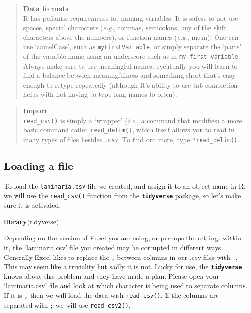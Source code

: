 \documentclass[]{book}
\newenvironment{Shaded}{\begin{snugshade}}{\end{snugshade}}
\newcommand{\KeywordTok}[1]{\textcolor[rgb]{0.13,0.29,0.53}{\textbf{#1}}}
\newcommand{\NormalTok}[1]{#1}
\theoremstyle{definition}
\theoremstyle{definition}
\theoremstyle{definition}
\theoremstyle{remark}
\begin{document}
\begin{quote}
\textbf{Data formats}\\
R has pedantic requirements for naming variables. It is safest to not
use spaces, special characters (\emph{e.g.}, commas, semicolons, any of
the shift characters above the numbers), or function names (\emph{e.g.},
mean). One can use `camelCase', such as \texttt{myFirstVariable}, or
simply separate the `parts' of the variable name using an underscore
such as in \texttt{my\_first\_variable}. Always make sure to use
meaningful names; eventually you will learn to find a balance between
meaningfulness and something short that's easy enough to retype
repeatedly (although R's ability to use tab completion helps with not
having to type long names to often).
\end{quote}

\begin{quote}
\textbf{Import}\\
\texttt{read\_csv()} is simply a `wrapper' (\emph{i.e.}, a command that
modifies) a more basic command called \texttt{read\_delim()}, which
itself allows you to read in many types of files besides \texttt{.csv}.
To find out more, type \texttt{?read\_delim()}.
\end{quote}

\subsection{Loading a file}\label{loading-a-file}

To load the \texttt{laminaria.csv} file we created, and assign it to an
object name in R, we will use the \texttt{read\_csv()} function from the
\textbf{\texttt{tidyverse}} package, so let's make sure it is activated.

\begin{Shaded}
\begin{Highlighting}[]
\KeywordTok{library}\NormalTok{(tidyverse)}
\end{Highlighting}
\end{Shaded}

Depending on the version of Excel you are using, or perhaps the settings
within it, the `laminaria.csv' file you created may be corrupted in
different ways. Generally Excel likes to replace the \texttt{,} between
columns in our .csv files with \texttt{;}. This may seem like a
triviality but sadly it is not. Lucky for use, the
\textbf{\texttt{tidyverse}} knows about this problem and they have made
a plan. Please open your `laminaria.csv' file and look at which
character is being used to separate columns. If it is \texttt{,} then we
will load the data with \texttt{read\_csv()}. If the columns are
separated with \texttt{;} we will use \texttt{read\_csv2()}.
\end{document}
